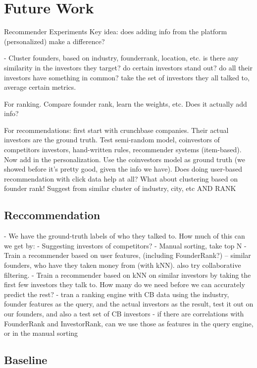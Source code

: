 \chapter{Future Work}


Recommender Experiments
Key idea: does adding info from the platform (personalized) make a difference?

- Cluster founders, based on industry, founderrank, location, etc. is there any similarity in the investors they target? do certain investors stand out? do all their investors have something in common? take the set of investors they all talked to, average certain metrics.

For ranking. Compare founder rank, learn the weights, etc. Does it actually add info?

For recommendations: first start with crunchbase companies. Their actual investors are the ground truth. Test semi-random model, coinvestors of competitors investors, hand-written rules, recommender systems (item-based). Now add in the personalization. Use the coinvestors model as ground truth (we showed before it's pretty good, given the info we have). Does doing user-based recommendation with click data help at all? What about clustering based on founder rank! Suggest from similar cluster of industry, city, etc AND RANK


\section{Reccommendation}

- We have the ground-truth labels of who they talked to. How much of this can we get by:
  - Suggesting investors of competitors?
  - Manual sorting, take top N
  - Train a recommender based on user features, (including FounderRank?) -- similar founders, who have they taken money from (with kNN). also try collaborative filtering.
  - Train a recommender based on kNN on similar investors by taking the first few investors they talk to. How many do we need before we can accurately predict the rest?
  - tran a ranking engine with CB data using the industry, founder features as the query, and the actual investors as the result, test it out on our founders, and also a test set of CB investors
  - if there are correlations with FounderRank and InvestorRank, can we use those as features in the query engine, or in the manual sorting


\section{Baseline}


